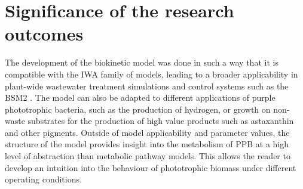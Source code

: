 \section{Significance of the research outcomes}
The development of the biokinetic model was done in such a way that it is compatible with the IWA family of models, leading to a broader applicability in plant-wide wastewater treatment simulations and control systems such as the BSM2 \cite{jeppsson2007}. The model can also be adapted to different applications of purple phototrophic bacteria, such as the production of hydrogen, or growth on non-waste substrates for the production of high value products such as astaxanthin and other pigments. Outside of model applicability and parameter values, the structure of the model provides insight into the metabolism of PPB at a high level of abstraction than metabolic pathway models. This allows the reader to develop an intuition into the behaviour of phototrophic biomass under different operating conditions. 
\skippingparagraph
